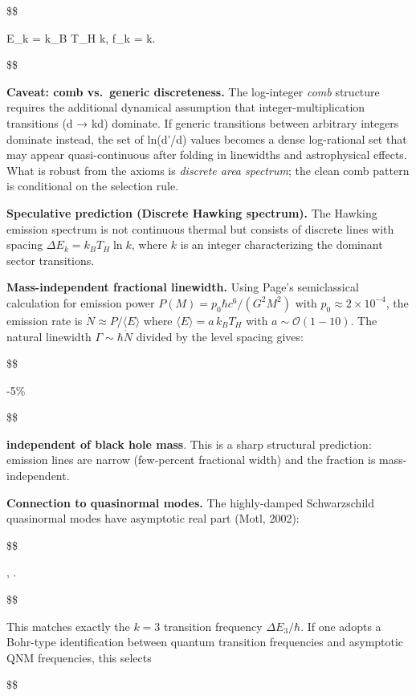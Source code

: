 \documentclass[11pt,a4paper]{article}
\theoremstyle{remark}
\begin{document}
\$\$

\Delta E\_k = k\_B T\_H \ln k, \qquad
\Delta f\_k =  \ln k.

\$\$

\textbf{Caveat: comb vs.~generic discreteness.} The log-integer \emph{comb} structure
requires the additional dynamical assumption that integer-multiplication
transitions (d → kd) dominate. If generic transitions between arbitrary
integers dominate instead, the set of ln(d'/d) values becomes a dense
log-rational set that may appear quasi-continuous after folding in linewidths
and astrophysical effects. What is robust from the axioms is \emph{discrete area
spectrum}; the clean comb pattern is conditional on the selection rule.

\textbf{Speculative prediction (Discrete Hawking spectrum).} The Hawking emission
spectrum is not continuous thermal but consists of discrete lines with
spacing \(\Delta E_k = k_B T_H \ln k\), where \(k\) is an integer characterizing
the dominant sector transitions.

\textbf{Mass-independent fractional linewidth.} Using Page's semiclassical
calculation for emission power \(P(M) = p_0 \hbar c^6 / (G^2 M^2)\) with
\(p_0 \approx 2 \times 10^{-4}\), the emission rate is \(\dot{N} \approx P /
\langle E \rangle\) where \(\langle E \rangle = a \, k_B T_H\) with \(a \sim
\mathcal{O}(1-10)\). The natural linewidth \(\Gamma \sim \hbar \dot{N}\)
divided by the level spacing gives:

\$\$

 \approx {} -5\%

\$\$

\textbf{independent of black hole mass}. This is a sharp structural prediction:
emission lines are narrow (few-percent fractional width) and the fraction
is mass-independent.

\textbf{Connection to quasinormal modes.} The highly-damped
Schwarzschild quasinormal modes have asymptotic real part (Motl, 2002):

\$\$

,\omega \to {} .

\$\$

This matches exactly the \(k = 3\) transition frequency \(\Delta E_3 / \hbar\).
If one adopts a Bohr-type identification between quantum transition
frequencies and asymptotic QNM frequencies, this selects

\$\$
\end{document}
